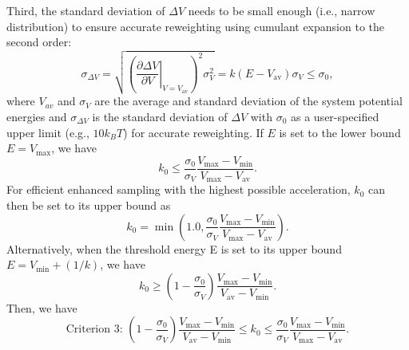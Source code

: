 Third, the standard deviation of $\Delta V$ needs to be small enough (i.e., narrow distribution) to ensure accurate reweighting using cumulant expansion to the second order:\cite{MiaoJCTC2014}
\begin{equation}
	\sigma_{\Delta V}=\sqrt{\left(\left.\frac{\partial \Delta V}{\partial V}\right|_{V=V_{\mathrm{av}}}\right)^{2} \sigma_{V}^{2}}=k\left(E-V_{\mathrm{av}}\right) \sigma_{V} \leq \sigma_{0},
\end{equation}
where $V_{av}$ and $\sigma_{V}$ are the average and standard deviation of the system potential energies and $\sigma_{\Delta V}$ is the standard deviation of $\Delta V$ with $\sigma_{0}$ as a user-specified upper limit (e.g., $10k_BT$) for accurate reweighting. If $E$ is set to the lower bound $E=V_{\mathrm{max}}$, we have
\begin{equation}
	k_{0} \leq \frac{\sigma_{0}}{\sigma_{V}} \frac{V_{\max }-V_{\min }}{V_{\max }-V_{\mathrm{av}}}.
\end{equation}
For efficient enhanced sampling with the highest possible acceleration, $k_0$ can then be set to its upper bound as
\begin{equation}
	k_{0}=\min \left(1.0, \frac{\sigma_{0}}{\sigma_{V}} \frac{V_{\max }-V_{\min }}{V_{\max }-V_{\mathrm{av}}}\right).
\end{equation}
Alternatively, when the threshold energy E is set to its upper bound $E = V_{\mathrm{min}} + (1/k)$, we have
\begin{equation}
	k_{0} \geq\left(1-\frac{\sigma_{0}}{\sigma_{V}}\right) \frac{V_{\max }-V_{\min }}{V_{\mathrm{av}}-V_{\min }}.
\end{equation}
Then, we have
\begin{equation}
	\text{Criterion 3: } \left(1-\frac{\sigma_{0}}{\sigma_{V}}\right) \frac{V_{\max }-V_{\min }}{V_{\mathrm{av}}-V_{\min }} \leq k_0 \leq \frac{\sigma_{0}}{\sigma_{V}} \frac{V_{\max }-V_{\min }}{V_{\max }-V_{\mathrm{av}}}.
\end{equation}